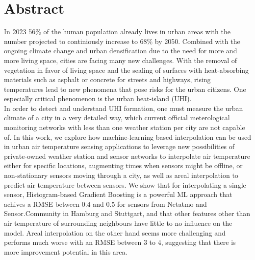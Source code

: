 \chapter*{Abstract}
In 2023 56\% of the human population already lives in urban areas with the number projected to continiously increase to 68\% by 2050. Combined with the ongoing climate change and urban densification due to the need for more and more living space, cities are facing many new challenges. With the removal of vegetation in favor of living space and the sealing of surfaces with heat-absorbing materials such as asphalt or concrete for streets and highways, rising temperatures lead to new phenomena that pose risks for the urban citizens. One especially critical phenomenon is the urban heat-island (UHI).\\
In order to detect and understand UHI formation, one must measure the urban climate of a city in a very detailed way, which current official meterological monitoring networks with less than one weather station per city are not capable of. In this work, we explore how machine-learning based interpolation can be used in urban air temperature sensing applications to leverage new possibilities of private-owned weather station and sensor networks to interpolate air temperature either for specific locations, augmenting times when sensors might be offline, or non-stationary sensors moving through a city, as well as areal interpolation to predict air temperature between sensors. We show that for interpolating a single sensor, Histogram-based Gradient Boosting is a powerful ML approach that achives a RMSE between 0.4 and 0.5 for sensors from Netatmo and Sensor.Community in Hamburg and Stuttgart, and that other features other than air temperature of surrounding neighbours have little to no influence on the model. Areal interpolation on the other hand seems more challenging and performs much worse with an RMSE between 3 to 4, suggesting that there is more improvement potential in this area.
